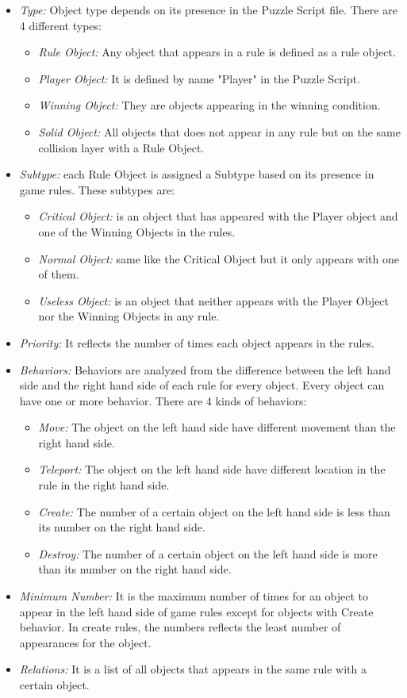 \documentclass[letterpaper]{article}
\begin{document}
\begin{itemize}
	\item \emph{Type:} Object type depends on its presence in the Puzzle Script file. There are 4 different types:
	\begin{itemize}
		\item \emph{Rule Object:} Any object that appears in a rule is defined as a rule object.
		\item \emph{Player Object:} It is defined by name "Player" in the Puzzle Script.
		\item \emph{Winning Object:} They are objects appearing in the winning condition.
		\item \emph{Solid Object:} All objects that does not appear in any rule but on the same collision layer with a Rule Object.
	\end{itemize}
	\item \emph{Subtype:} each Rule Object is assigned a Subtype based on its presence in game rules. These subtypes are:
	\begin{itemize}
		\item \emph{Critical Object:} is an object that has appeared with the Player object and one of the Winning Objects in the rules.
		\item \emph{Normal Object:} same like the Critical Object but it only appears with one of them.
		\item \emph{Useless Object:} is an object that neither appears with the Player Object nor the Winning Objects in any rule.
	\end{itemize}
	\item \emph{Priority:} It reflects the number of times each object appears in the rules.
	\item \emph{Behaviors:} Behaviors are analyzed from the difference between the left hand side and the right hand side of each rule for every object. Every object can have one or more behavior. There are 4 kinds of behaviors:
		\begin{itemize}
			\item \emph{Move:} The object on the left hand side have different movement than the right hand side.
			\item \emph{Teleport:} The object on the left hand side have different location in the rule in the right hand side.
			\item \emph{Create:} The number of a certain object on the left hand side is less than its number on the right hand side.
			\item \emph{Destroy:} The number of a certain object on the left hand side is more than its number on the right hand side.
		\end{itemize}
	\item \emph{Minimum Number:} It is the maximum number of times for an object to appear in the left hand side of game rules except for objects with Create behavior. In create rules, the numbers reflects the least number of appearances for the object.
	\item \emph{Relations:} It is a list of all objects that appears in the same rule with a certain object.
\end{itemize}
\end{document}
